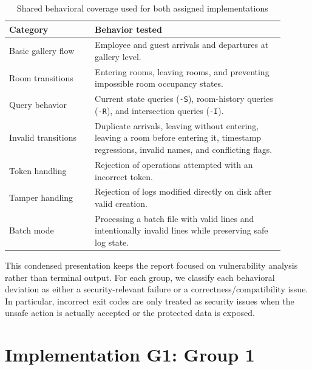 \documentclass[a4paper, 12pt]{article}
\begin{document}
    \begin{table}[H]
        \centering
        \small
        \begin{tabular}{p{0.28\linewidth}p{0.62\linewidth}}
            \toprule
            \textbf{Category} & \textbf{Behavior tested} \\
            \midrule
            Basic gallery flow & Employee and guest arrivals and departures at gallery level. \\
            Room transitions & Entering rooms, leaving rooms, and preventing impossible room occupancy states. \\
            Query behavior & Current state queries (\texttt{-S}), room-history queries (\texttt{-R}), and intersection queries (\texttt{-I}). \\
            Invalid transitions & Duplicate arrivals, leaving without entering, leaving a room before entering it, timestamp regressions, invalid names, and conflicting flags. \\
            Token handling & Rejection of operations attempted with an incorrect token. \\
            Tamper handling & Rejection of logs modified directly on disk after valid creation. \\
            Batch mode & Processing a batch file with valid lines and intentionally invalid lines while preserving safe log state. \\
            \bottomrule
        \end{tabular}
        \caption{Shared behavioral coverage used for both assigned implementations}
        \label{tab:shared-demo-coverage}
    \end{table}

    This condensed presentation keeps the report focused on vulnerability analysis rather than terminal output. For each group, we classify each behavioral deviation as either a security-relevant failure or a correctness/compatibility issue. In particular, incorrect exit codes are only treated as security issues when the unsafe action is actually accepted or the protected data is exposed.

    \section{Implementation G1: Group 1}
\end{document}

